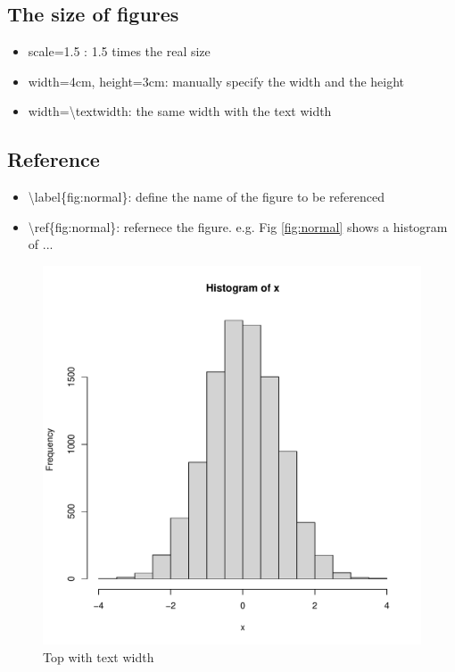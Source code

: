 \documentclass[11pt]{article}
\theoremstyle{quest}
\begin{document}
\subsection{The size of figures}
\begin{itemize}
  \item scale=1.5 : 1.5 times the real size 
  \item width=4cm, height=3cm: manually specify the width and the height 
  \item width=\textbackslash textwidth: the same width with the text width 
\end{itemize}

\subsection{Reference}
\begin{itemize}
  \item \textbackslash label\{fig:normal\}: define the name of the figure to be referenced 
  \item \textbackslash ref\{fig:normal\}: refernece the figure. e.g. Fig \ref{fig:normal} shows a histogram of ...
\end{itemize}



\begin{figure}[t]  
\centering 
\includegraphics[width=\textwidth]{figs/normal.pdf} 
\caption{ 
  Top with text width 
}
\end{figure}
\end{document}
